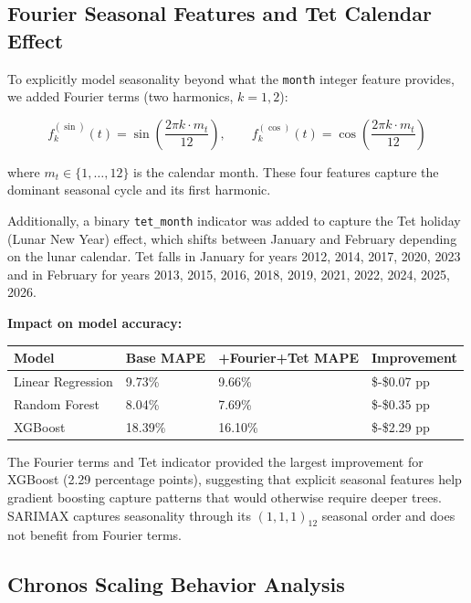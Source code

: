 \documentclass[
]{article}
\begin{document}
\subsection{Fourier Seasonal Features and Tet Calendar
Effect}\label{fourier-seasonal-features-and-tet-calendar-effect}

To explicitly model seasonality beyond what the \texttt{month} integer
feature provides, we added Fourier terms (two harmonics, \(k=1,2\)):

\[f_k^{(\sin)}(t) = \sin\!\left(\frac{2\pi k \cdot m_t}{12}\right), \qquad f_k^{(\cos)}(t) = \cos\!\left(\frac{2\pi k \cdot m_t}{12}\right)\]

where \(m_t \in \{1,\ldots,12\}\) is the calendar month. These four
features capture the dominant seasonal cycle and its first harmonic.

Additionally, a binary \texttt{tet\_month} indicator was added to
capture the Tet holiday (Lunar New Year) effect, which shifts between
January and February depending on the lunar calendar. Tet falls in
January for years 2012, 2014, 2017, 2020, 2023 and in February for years
2013, 2015, 2016, 2018, 2019, 2021, 2022, 2024, 2025, 2026.

\textbf{Impact on model accuracy:}

\begin{longtable}[]{@{}llll@{}}
\toprule\noalign{}
Model & Base MAPE & +Fourier+Tet MAPE & Improvement \\
\midrule\noalign{}
\endhead
\bottomrule\noalign{}
\endlastfoot
Linear Regression & 9.73\% & 9.66\% & \$-\$0.07 pp \\
Random Forest & 8.04\% & 7.69\% & \$-\$0.35 pp \\
XGBoost & 18.39\% & 16.10\% & \$-\$2.29 pp \\
\end{longtable}

The Fourier terms and Tet indicator provided the largest improvement for
XGBoost (2.29 percentage points), suggesting that explicit seasonal
features help gradient boosting capture patterns that would otherwise
require deeper trees. SARIMAX captures seasonality through its
\((1,1,1)_{12}\) seasonal order and does not benefit from Fourier terms.

\subsection{Chronos Scaling Behavior
Analysis}\label{chronos-scaling-behavior-analysis}
\end{document}
